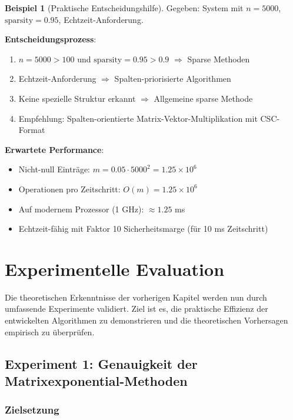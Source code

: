 ﻿\documentclass[a4paper,12pt]{report}
\theoremstyle{definition}
\newtheorem{beispiel}{Beispiel}
\begin{document}
	\begin{beispiel}[Praktische Entscheidungshilfe]
		Gegeben: System mit $n = 5000$, $\text{sparsity} = 0.95$, Echtzeit-Anforderung.
		
		\textbf{Entscheidungsprozess}:
		\begin{enumerate}
			\item $n = 5000 > 100$ und $\text{sparsity} = 0.95 > 0.9$ $\Rightarrow$ Sparse Methoden
			\item Echtzeit-Anforderung $\Rightarrow$ Spalten-priorisierte Algorithmen
			\item Keine spezielle Struktur erkannt $\Rightarrow$ Allgemeine sparse Methode
			\item Empfehlung: Spalten-orientierte Matrix-Vektor-Multiplikation mit CSC-Format
		\end{enumerate}
		
		\textbf{Erwartete Performance}:
		\begin{itemize}
			\item Nicht-null Einträge: $m = 0.05 \cdot 5000^2 = 1.25 \times 10^6$
			\item Operationen pro Zeitschritt: $O(m) = 1.25 \times 10^6$
			\item Auf modernem Prozessor (1 GHz): $\approx 1.25$ ms
			\item Echtzeit-fähig mit Faktor 10 Sicherheitsmarge (für 10 ms Zeitschritt)
		\end{itemize}
	\end{beispiel}
	
	\chapter{Experimentelle Evaluation}
	
	Die theoretischen Erkenntnisse der vorherigen Kapitel werden nun durch umfassende Experimente validiert. Ziel ist es, die praktische Effizienz der entwickelten Algorithmen zu demonstrieren und die theoretischen Vorhersagen empirisch zu überprüfen.
	
	\section{Experiment 1: Genauigkeit der Matrixexponential-Metho\-den}
	
	\subsection{Zielsetzung}
	
\end{document}

